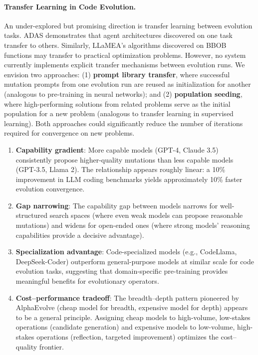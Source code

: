 \paragraph{Transfer Learning in Code Evolution.}
An under-explored but promising direction is transfer learning between evolution tasks. ADAS demonstrates that agent architectures discovered on one task transfer to others. Similarly, LLaMEA's algorithms discovered on BBOB functions may transfer to practical optimization problems. However, no system currently implements explicit transfer mechanisms between evolution runs. We envision two approaches: (1) \textbf{prompt library transfer}, where successful mutation prompts from one evolution run are reused as initialization for another (analogous to pre-training in neural networks); and (2) \textbf{population seeding}, where high-performing solutions from related problems serve as the initial population for a new problem (analogous to transfer learning in supervised learning). Both approaches could significantly reduce the number of iterations required for convergence on new problems.

\begin{enumerate}
    \item \textbf{Capability gradient}: More capable models (GPT-4, Claude 3.5) consistently propose higher-quality mutations than less capable models (GPT-3.5, Llama 2). The relationship appears roughly linear: a 10\% improvement in LLM coding benchmarks yields approximately 10\% faster evolution convergence.

    \item \textbf{Gap narrowing}: The capability gap between models narrows for well-structured search spaces (where even weak models can propose reasonable mutations) and widens for open-ended ones (where strong models' reasoning capabilities provide a decisive advantage).

    \item \textbf{Specialization advantage}: Code-specialized models (e.g., CodeLlama, DeepSeek-Coder) outperform general-purpose models at similar scale for code evolution tasks, suggesting that domain-specific pre-training provides meaningful benefits for evolutionary operators.

    \item \textbf{Cost--performance tradeoff}: The breadth--depth pattern pioneered by AlphaEvolve (cheap model for breadth, expensive model for depth) appears to be a general principle. Assigning cheap models to high-volume, low-stakes operations (candidate generation) and expensive models to low-volume, high-stakes operations (reflection, targeted improvement) optimizes the cost--quality frontier.
\end{enumerate}


